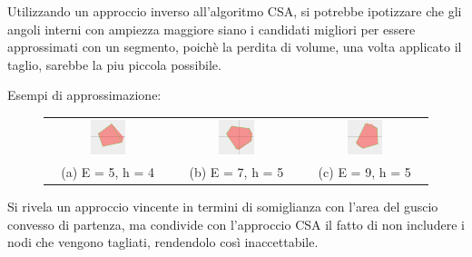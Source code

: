 Utilizzando un approccio inverso all'algoritmo CSA, si potrebbe ipotizzare che gli angoli interni 
con ampiezza maggiore siano i candidati migliori per essere approssimati con un segmento, 
poichè la perdita di volume, una volta applicato il taglio, sarebbe la piu piccola possibile.

\begin{center}
    Esempi di approssimazione:
\end{center}
\begin{figure}[H]
    \centering
    \begin{tabular}{ccc}
        \includegraphics[width=0.3\textwidth]{media/CuttingLargerAngle/5_4.png} &
        \includegraphics[width=0.3\textwidth]{media/CuttingLargerAngle/7_5.png} &
        \includegraphics[width=0.3\textwidth]{media/CuttingLargerAngle/9_5.png} \\
        (a) E = 5, h = 4 & (b) E = 7, h = 5 & (c) E = 9, h = 5
    \end{tabular}
\end{figure}

Si rivela un approccio vincente in termini di somiglianza con l'area del guscio convesso di partenza, 
ma condivide con l'approccio CSA il fatto di non includere i nodi che vengono tagliati,
rendendolo così inaccettabile.

